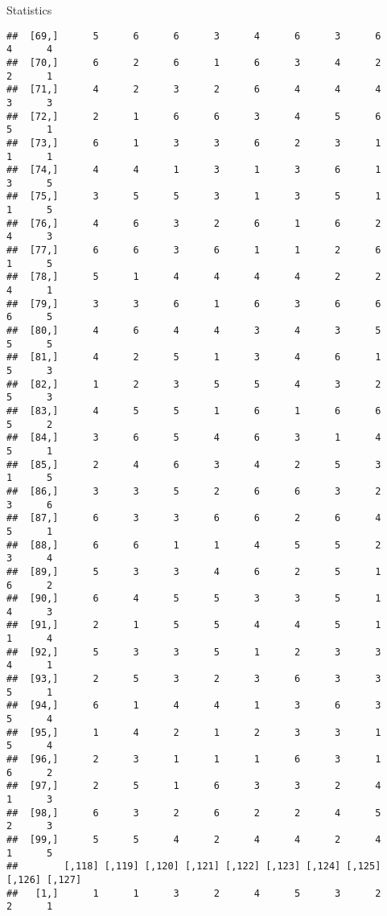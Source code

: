 \documentclass[
  ignorenonframetext,
]{beamer}
\begin{document}
\begin{frame}[fragile]{Statistics}
\begin{verbatim}
##  [69,]      5      6      6      3      4      6      3      6      4      4
##  [70,]      6      2      6      1      6      3      4      2      2      1
##  [71,]      4      2      3      2      6      4      4      4      3      3
##  [72,]      2      1      6      6      3      4      5      6      5      1
##  [73,]      6      1      3      3      6      2      3      1      1      1
##  [74,]      4      4      1      3      1      3      6      1      3      5
##  [75,]      3      5      5      3      1      3      5      1      1      5
##  [76,]      4      6      3      2      6      1      6      2      4      3
##  [77,]      6      6      3      6      1      1      2      6      1      5
##  [78,]      5      1      4      4      4      4      2      2      4      1
##  [79,]      3      3      6      1      6      3      6      6      6      5
##  [80,]      4      6      4      4      3      4      3      5      5      5
##  [81,]      4      2      5      1      3      4      6      1      5      3
##  [82,]      1      2      3      5      5      4      3      2      5      3
##  [83,]      4      5      5      1      6      1      6      6      5      2
##  [84,]      3      6      5      4      6      3      1      4      5      1
##  [85,]      2      4      6      3      4      2      5      3      1      5
##  [86,]      3      3      5      2      6      6      3      2      3      6
##  [87,]      6      3      3      6      6      2      6      4      5      1
##  [88,]      6      6      1      1      4      5      5      2      3      4
##  [89,]      5      3      3      4      6      2      5      1      6      2
##  [90,]      6      4      5      5      3      3      5      1      4      3
##  [91,]      2      1      5      5      4      4      5      1      1      4
##  [92,]      5      3      3      5      1      2      3      3      4      1
##  [93,]      2      5      3      2      3      6      3      3      5      1
##  [94,]      6      1      4      4      1      3      6      3      5      4
##  [95,]      1      4      2      1      2      3      3      1      5      4
##  [96,]      2      3      1      1      1      6      3      1      6      2
##  [97,]      2      5      1      6      3      3      2      4      1      3
##  [98,]      6      3      2      6      2      2      4      5      2      3
##  [99,]      5      5      4      2      4      4      2      4      1      5
##        [,118] [,119] [,120] [,121] [,122] [,123] [,124] [,125] [,126] [,127]
##   [1,]      1      1      3      2      4      5      3      2      2      1

\end{verbatim}
\end{frame}
\end{document}
